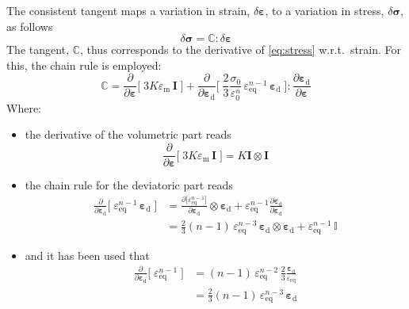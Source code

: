\documentclass[times,namecite]{goose-article}
\begin{document}
The consistent tangent maps a variation in strain, $\delta \bm{\varepsilon}$, to a variation in stress, $\delta \bm{\sigma}$, as follows
%
\begin{equation}
  \delta \bm{\sigma} = \mathbb{C} : \delta \bm{\varepsilon}
\end{equation}
%
The tangent, $\mathbb{C}$, thus corresponds to the derivative of \eqref{eq:stress} w.r.t.\ strain. For this, the chain rule is employed:
%
\begin{equation}
  \mathbb{C}
  = \frac{\partial}{\partial \bm{\varepsilon}}
    \bigg[\;
      3 K \varepsilon_\mathrm{m} \, \bm{I}
    \;\bigg]
  + \frac{\partial}{\partial \bm{\varepsilon}_\mathrm{d}}
    \bigg[\;
      \frac{2}{3} \frac{\sigma_0}{\varepsilon_0^n} \,
      \varepsilon_\mathrm{eq}^{n-1} \, \bm{\varepsilon}_\mathrm{d}
    \;\bigg]
  : \frac{\partial \bm{\varepsilon}_\mathrm{d}}{\partial \bm{\varepsilon}}
\end{equation}
%
Where:
\begin{itemize}
%
\item the derivative of the volumetric part reads
%
\begin{equation}
  \frac{\partial}{\partial \bm{\varepsilon}}
  \bigg[\;
    3 K \varepsilon_\mathrm{m} \, \bm{I}
  \;\bigg]
  = K \bm{I} \otimes \bm{I}
\end{equation}
%
\item the chain rule for the deviatoric part reads
%
\begin{align}
  \frac{\partial}{\partial \bm{\varepsilon}_\mathrm{d}}
  \bigg[\;
    \varepsilon_\mathrm{eq}^{n-1} \, \bm{\varepsilon}_\mathrm{d}
  \;\bigg]
  &=
  \frac{
    \partial \big[ \varepsilon_\mathrm{eq}^{n-1} \big]
  }{
    \partial \bm{\varepsilon}_\mathrm{d}
  } \otimes \bm{\varepsilon}_\mathrm{d}
  + \varepsilon_\mathrm{eq}^{n-1}
  \frac{
    \partial \bm{\varepsilon}_\mathrm{d}
  }{
    \partial \bm{\varepsilon}_\mathrm{d}
  }
  \\
  &=
  \tfrac{2}{3} (n-1) \, \varepsilon_\mathrm{eq}^{n-3} \,
  \bm{\varepsilon}_\mathrm{d} \otimes \bm{\varepsilon}_\mathrm{d}
  + \varepsilon_\mathrm{eq}^{n-1} \, \mathbb{I}
\end{align}
%
\item and it has been used that
%
\begin{align}
  \frac{\partial}{\partial \bm{\varepsilon}_\mathrm{d}}
  \bigg[\;
    \varepsilon_\mathrm{eq}^{n-1}
  \;\bigg]
  &= (n-1)\, \varepsilon_\mathrm{eq}^{n-2} \,
  \frac{2}{3} \frac{\bm{\varepsilon}_\mathrm{d}}{\varepsilon_\mathrm{eq}}
  \\
  &= \tfrac{2}{3} (n-1) \,
    \varepsilon_\mathrm{eq}^{n-3} \, \bm{\varepsilon}_\mathrm{d}
\end{align}
%
\end{itemize}
%
\end{document}
